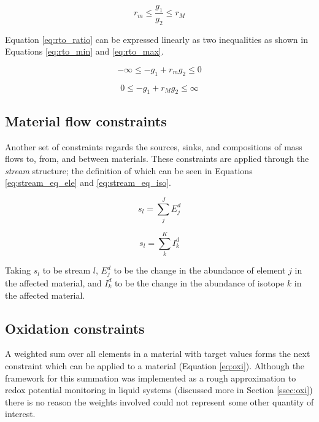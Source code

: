 \begin{equation}
\label{eq:rto_ratio}
r_{m} \leq \frac{g_{1}}{g_{2}} \leq r_{M} 
\end{equation}

Equation \ref{eq:rto_ratio} can be expressed linearly as two inequalities as
shown in Equations \ref{eq:rto_min} and \ref{eq:rto_max}.

\begin{equation}
\label{eq:rto_min}
-\infty \leq -g_{1} + r_{m}g_{2} \leq 0
\end{equation}

\begin{equation}
\label{eq:rto_max}
0 \leq -g_{1} + r_{M}g_{2} \leq \infty
\end{equation}


\subsection{Material flow constraints} \label{ssec:stream_eq}
Another set of constraints regards the sources, sinks, and compositions of mass
flows to, from, and between materials. These constraints are applied through 
the \textit{stream} structure; the definition of which can be
seen in Equations \ref{eq:stream_eq_ele} and \ref{eq:stream_eq_iso}.

\begin{equation}
\label{eq:stream_eq_ele}
s_{l} = \sum \limits_{j}^{J} E_{j}^{d}
\end{equation}

\begin{equation}
\label{eq:stream_eq_iso}
s_{l} = \sum \limits_{k}^{K} I_{k}^{d}
\end{equation}

Taking $s_{l}$ to be stream $l$, $E_{j}^{d}$ to be the change in the 
abundance of element $j$ in the affected material, and $I_{k}^{d}$ to be 
the change in the abundance of isotope $k$ in the affected
material.

\subsection{Oxidation constraints} \label{ssec:oxid_eq}
A weighted sum over all elements in a material with target values forms the 
next constraint which can be applied to a material (Equation \ref{eq:oxi}). 
Although the framework for this summation was implemented as a rough 
approximation to redox potential
monitoring in liquid systems (discussed more in Section \ref{ssec:oxi}) there is
no reason the weights involved could not represent some other quantity of 
interest. 

